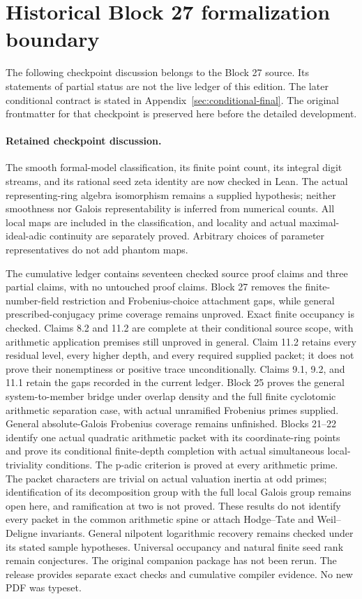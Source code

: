 \documentclass[11pt]{article}
\theoremstyle{definition}
\theoremstyle{remark}
\begin{document}
\section*{Historical Block 27 formalization boundary}
The following checkpoint discussion belongs to the Block 27 source. Its statements
of partial status are not the live ledger of this edition. The later conditional
contract is stated in Appendix~\ref{sec:conditional-final}. The original frontmatter
for that checkpoint is preserved here before the detailed development.

\paragraph{Retained checkpoint discussion.}
The smooth formal-model classification, its finite point count, its integral digit streams, and its rational seed zeta identity are now checked in Lean. The actual representing-ring algebra isomorphism remains a supplied hypothesis; neither smoothness nor Galois representability is inferred from numerical counts. All local maps are included in the classification, and locality and actual maximal-ideal-adic continuity are separately proved. Arbitrary choices of parameter representatives do not add phantom maps.

The cumulative ledger contains seventeen checked source proof claims and three partial claims, with no untouched proof claims. Block 27 removes the finite-number-field restriction and Frobenius-choice attachment gaps, while general prescribed-conjugacy prime coverage remains unproved. Exact finite occupancy is checked. Claims 8.2 and 11.2 are complete at their conditional source scope, with arithmetic application premises still unproved in general. Claim 11.2 retains every residual level, every higher depth, and every required supplied packet; it does not prove their nonemptiness or positive trace unconditionally. Claims 9.1, 9.2, and 11.1 retain the gaps recorded in the current ledger. Block 25 proves the general system-to-member bridge under overlap density and the full finite cyclotomic arithmetic separation case, with actual unramified Frobenius primes supplied. General absolute-Galois Frobenius coverage remains unfinished. Blocks 21--22 identify one actual quadratic arithmetic packet with its coordinate-ring points and prove its conditional finite-depth completion with actual simultaneous local-triviality conditions. The p-adic criterion is proved at every arithmetic prime. The packet characters are trivial on actual valuation inertia at odd primes; identification of its decomposition group with the full local Galois group remains open here, and ramification at two is not proved. These results do not identify every packet in the common arithmetic spine or attach Hodge--Tate and Weil--Deligne invariants. General nilpotent logarithmic recovery remains checked under its stated sample hypotheses. Universal occupancy and natural finite seed rank remain conjectures. The original companion package has not been rerun. The release provides separate exact checks and cumulative compiler evidence. No new PDF was typeset.
\end{document}
